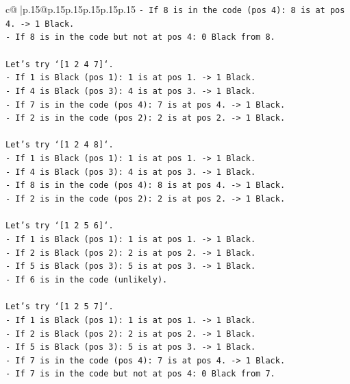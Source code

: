 \documentclass{article}
\begin{document}
{\begin{supertabular}{c@{$\;$}|p{.15\linewidth}@{}p{.15\linewidth}p{.15\linewidth}p{.15\linewidth}p{.15\linewidth}p{.15\linewidth}}
{{{\texttt{{-} If 8 is in the code (pos 4): 8 is at pos 4. {-}> 1 Black.} \\
\texttt{{-} If 8 is in the code but not at pos 4: 0 Black from 8.} \\
\\ 
\texttt{Let's try `{[}1 2 4 7{]}`.} \\
\texttt{{-} If 1 is Black (pos 1): 1 is at pos 1. {-}> 1 Black.} \\
\texttt{{-} If 4 is Black (pos 3): 4 is at pos 3. {-}> 1 Black.} \\
\texttt{{-} If 7 is in the code (pos 4): 7 is at pos 4. {-}> 1 Black.} \\
\texttt{{-} If 2 is in the code (pos 2): 2 is at pos 2. {-}> 1 Black.} \\
\\ 
\texttt{Let's try `{[}1 2 4 8{]}`.} \\
\texttt{{-} If 1 is Black (pos 1): 1 is at pos 1. {-}> 1 Black.} \\
\texttt{{-} If 4 is Black (pos 3): 4 is at pos 3. {-}> 1 Black.} \\
\texttt{{-} If 8 is in the code (pos 4): 8 is at pos 4. {-}> 1 Black.} \\
\texttt{{-} If 2 is in the code (pos 2): 2 is at pos 2. {-}> 1 Black.} \\
\\ 
\texttt{Let's try `{[}1 2 5 6{]}`.} \\
\texttt{{-} If 1 is Black (pos 1): 1 is at pos 1. {-}> 1 Black.} \\
\texttt{{-} If 2 is Black (pos 2): 2 is at pos 2. {-}> 1 Black.} \\
\texttt{{-} If 5 is Black (pos 3): 5 is at pos 3. {-}> 1 Black.} \\
\texttt{{-} If 6 is in the code (unlikely).} \\
\\ 
\texttt{Let's try `{[}1 2 5 7{]}`.} \\
\texttt{{-} If 1 is Black (pos 1): 1 is at pos 1. {-}> 1 Black.} \\
\texttt{{-} If 2 is Black (pos 2): 2 is at pos 2. {-}> 1 Black.} \\
\texttt{{-} If 5 is Black (pos 3): 5 is at pos 3. {-}> 1 Black.} \\
\texttt{{-} If 7 is in the code (pos 4): 7 is at pos 4. {-}> 1 Black.} \\
\texttt{{-} If 7 is in the code but not at pos 4: 0 Black from 7.} \\
\\ 
}}}
\end{supertabular}}
\end{document}
